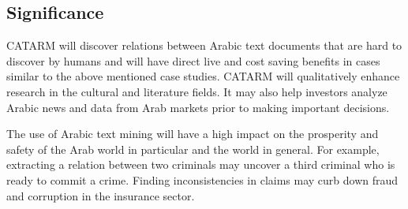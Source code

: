 \documentclass[12pt]{article}
\begin{document}
 
\subsection{Significance} 

CATARM will discover relations between Arabic text documents that 
are hard to discover by humans and will have direct live and
cost saving benefits in cases similar to the above mentioned 
case studies. 
CATARM will qualitatively enhance research in the cultural and 
literature fields. 
It may also help investors analyze Arabic news and data from Arab 
markets prior to making important decisions.

The use of Arabic text mining  will 
have a high impact on the prosperity and safety of the Arab world 
in particular and the world in general.
For example, extracting a relation between two criminals may 
uncover a third criminal who is ready to commit a crime.
Finding inconsistencies in claims may curb down fraud and corruption 
in the insurance sector.
\end{document}

